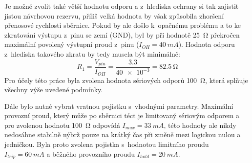             Je možné zvolit také větší hodnotu odporu a z~hlediska ochrany si tak zajistit jistou návrhovou rezervu, příliš velká hodnota by však způsobila zhoršení přenosové rychlosti sběrnice. Pokud by ale došlo k~opačnému problému a to ke zkratování výstupu z~pinu se zemí (GND), byl by při hodnotě \qty{25}{\ohm} překročen maximální povolený výstupní proud z~pinu (\(I_{OH}=\qty{40}{mA}\)). Hodnota odporu z~hlediska takového zkratu by tedy musela být minimálně:
            \begin{equation}
                R_{1} =\frac{V_{pin}}{I_{OH} }=\frac{\num{3.3}}{\num{40e-3}}=\qty{82.5}{\ohm}
            \end{equation}
            Pro účely této práce byla zvolena hodnota sériových odporů \qty{100}{\ohm}, která splňuje všechny výše uvedené podmínky.

            Dále bylo nutné vybrat vratnou pojistku s~vhodnými parametry. Maximální provozní proud, který může po sběrnici téct je limitovaný sériovým odporem a pro zvolenou hodnotu \qty{100}{\ohm} odpovídá \(I_{max} =\qty{33}{mA}\), této hodnoty ale nikdy nedosáhne stabilně nýbrž pouze na krátký čas při změně mezi logickou nulou a jedničkou. Byla proto zvolena pojistka s~hodnotou limitního proudu \(I_{trip} =\qty{60}{mA}\) a běžného provozního proudu \(I_{hold} =\qty{20}{mA}\). 

